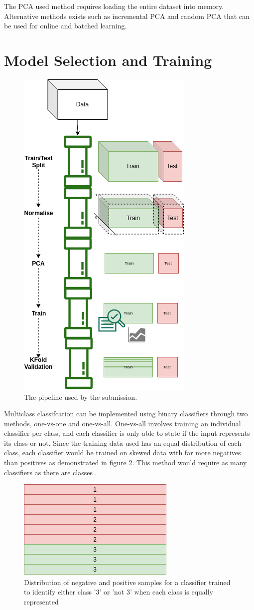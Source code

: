 \documentclass[12pt]{article}
\begin{document}
The PCA used method requires loading the entire dataset into memory. Alternative methods exists such as incremental PCA and random PCA that can be used for online and batched learning.

\section{Model Selection and Training}

\begin{figure}[!ht]
	\centering
	\includegraphics[width=0.5\linewidth]{images/pipe}
	\caption{The pipeline used by the submission.}
	\label{fig:pipeline}
\end{figure}

Multiclass classifcation can be implemented using binary classifiers through two methods, one-vs-one and one-vs-all. One-vs-all involves training an individual classifier per class, and each classifier is only able to state if the input represents its class or not. Since the training data used has an equal distribution of each class, each classifier would be trained on skewed data with far more negatives than positives as demonstrated in figure \ref{fig:classifierperclass}. This method would require as many classifiers as there are classes \cite{handson}.

\begin{figure}[!ht]
	\centering
	\includegraphics[width=0.5\linewidth]{images/classifierperclass}
	\caption{Distribution of negative and positive samples for a classifier trained to identify either class '3' or 'not 3' when each class is equally represented}
	\label{fig:classifierperclass}
\end{figure}
\end{document}
